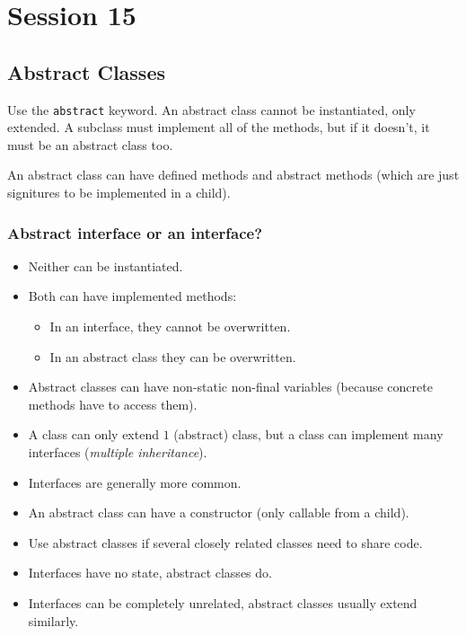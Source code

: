 \section{Session 15}\label{sec:session_15}

\subsection{Abstract Classes}\label{sub:abstract_classes}

Use the \texttt{abstract} keyword.
An abstract class cannot be instantiated, only extended.
A subclass must implement all of the methods, but if it doesn't, it must be an abstract class too.

An abstract class can have defined methods and abstract methods (which are just signitures to be implemented in a child).

\subsubsection{Abstract interface or an interface?}\label{ssub:abstract_interface_or_an_interface_}

\begin{itemize}
	\item Neither can be instantiated.
	\item Both can have implemented methods:
	      \begin{itemize}
		      \item In an interface, they cannot be overwritten.
		      \item In an abstract class they can be overwritten.
	      \end{itemize}
	\item Abstract classes can have non-static non-final variables (because concrete methods have to access them).
	\item A class can only extend \(1\) (abstract) class, but a class can implement many interfaces (\emph{multiple inheritance}).
	\item Interfaces are generally more common.
	\item An abstract class can have a constructor (only callable from a child).
	\item Use abstract classes if several closely related classes need to share code.
	\item Interfaces have no state, abstract classes do.
	\item Interfaces can be completely unrelated, abstract classes usually extend similarly.
\end{itemize}
